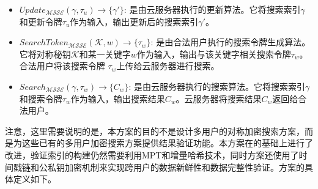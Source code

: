 \begin{definition}
{\begin{itemize}
        \item $Update_{\mathcal{MSSE}}(\gamma, \tau_u) \rightarrow \{\gamma'\}$: 是由云服务器执行的更新算法。它将搜索索引$\gamma$和更新令牌$\tau_u$作为输入，输出更新后的搜索索引$\gamma'$。
        \item $SearchToken_{\mathcal{MSSE}}(\mathcal{K}, w) \rightarrow \{\tau_{w}\}$: 是由合法用户执行的搜索令牌生成算法。它将对称秘钥$\mathcal{K}$和某一关键字$w$作为输入，输出与该关键字相关搜索令牌$\tau_{w}$。合法用户将该搜索令牌 $\tau_{w}$上传给云服务器进行搜索。
        \item $Search_{\mathcal{MSSE}}(\gamma, \tau_{w}) \rightarrow \{C_w\}$: 是由云服务器执行的搜索算法。它将搜索索引$\gamma$和搜索令牌$\tau_{w}$作为输入，输出搜索结果$C_w$。云服务器将搜索结果$C_w$返回给合法用户。
      \end{itemize}
      }
\end{definition}

注意，这里需要说明的是，本方案的目的不是设计多用户的对称加密搜索方案，而是为这些已有的多用户加密搜索方案提供结果验证功能。本方案在\single 的基础上进行了改进，验证索引的构建仍然需要利用MPT和增量哈希技术，同时\multi 方案还使用了时间戳链和公私钥加密机制来实现跨用户的数据新鲜性和数据完整性验证。\multi 方案的具体定义如下。

